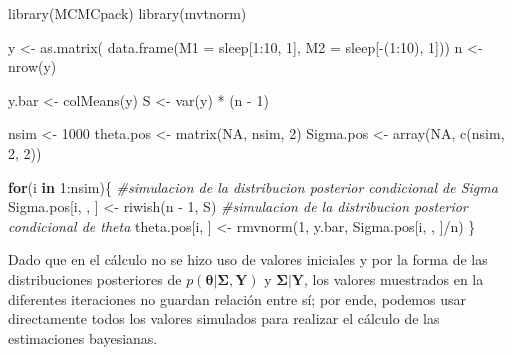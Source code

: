 \documentclass[
  10pt,
  spanish,
]{book}
\newenvironment{Shaded}{\begin{snugshade}}{\end{snugshade}}
\newcommand{\AttributeTok}[1]{\textcolor[rgb]{0.77,0.63,0.00}{#1}}
\newcommand{\CommentTok}[1]{\textcolor[rgb]{0.56,0.35,0.01}{\textit{#1}}}
\newcommand{\ConstantTok}[1]{\textcolor[rgb]{0.00,0.00,0.00}{#1}}
\newcommand{\ControlFlowTok}[1]{\textcolor[rgb]{0.13,0.29,0.53}{\textbf{#1}}}
\newcommand{\DecValTok}[1]{\textcolor[rgb]{0.00,0.00,0.81}{#1}}
\newcommand{\FunctionTok}[1]{\textcolor[rgb]{0.00,0.00,0.00}{#1}}
\newcommand{\NormalTok}[1]{#1}
\newcommand{\OtherTok}[1]{\textcolor[rgb]{0.56,0.35,0.01}{#1}}
\newcommand{\SpecialCharTok}[1]{\textcolor[rgb]{0.00,0.00,0.00}{#1}}
\theoremstyle{definition}
\theoremstyle{definition}
\theoremstyle{definition}
\theoremstyle{definition}
\theoremstyle{remark}
\begin{document}
\begin{Shaded}
\begin{Highlighting}[]
\FunctionTok{library}\NormalTok{(MCMCpack)}
\FunctionTok{library}\NormalTok{(mvtnorm)}

\NormalTok{y }\OtherTok{\textless{}{-}} \FunctionTok{as.matrix}\NormalTok{(}
  \FunctionTok{data.frame}\NormalTok{(}\AttributeTok{M1 =}\NormalTok{ sleep[}\DecValTok{1}\SpecialCharTok{:}\DecValTok{10}\NormalTok{, }\DecValTok{1}\NormalTok{], }
             \AttributeTok{M2 =}\NormalTok{ sleep[}\SpecialCharTok{{-}}\NormalTok{(}\DecValTok{1}\SpecialCharTok{:}\DecValTok{10}\NormalTok{), }\DecValTok{1}\NormalTok{]))}
\NormalTok{n }\OtherTok{\textless{}{-}} \FunctionTok{nrow}\NormalTok{(y)}

\NormalTok{y.bar }\OtherTok{\textless{}{-}} \FunctionTok{colMeans}\NormalTok{(y)}
\NormalTok{S }\OtherTok{\textless{}{-}} \FunctionTok{var}\NormalTok{(y) }\SpecialCharTok{*}\NormalTok{ (n }\SpecialCharTok{{-}} \DecValTok{1}\NormalTok{)}

\NormalTok{nsim }\OtherTok{\textless{}{-}} \DecValTok{1000}
\NormalTok{theta.pos }\OtherTok{\textless{}{-}} \FunctionTok{matrix}\NormalTok{(}\ConstantTok{NA}\NormalTok{, nsim, }\DecValTok{2}\NormalTok{)}
\NormalTok{Sigma.pos }\OtherTok{\textless{}{-}} \FunctionTok{array}\NormalTok{(}\ConstantTok{NA}\NormalTok{, }\FunctionTok{c}\NormalTok{(nsim, }\DecValTok{2}\NormalTok{, }\DecValTok{2}\NormalTok{))}

\ControlFlowTok{for}\NormalTok{(i }\ControlFlowTok{in} \DecValTok{1}\SpecialCharTok{:}\NormalTok{nsim)\{}
  \CommentTok{\#simulacion de la distribucion posterior condicional de Sigma}
\NormalTok{  Sigma.pos[i, , ] }\OtherTok{\textless{}{-}} \FunctionTok{riwish}\NormalTok{(n }\SpecialCharTok{{-}} \DecValTok{1}\NormalTok{, S)}
  \CommentTok{\#simulacion de la distribucion posterior condicional de theta}
\NormalTok{  theta.pos[i, ] }\OtherTok{\textless{}{-}} \FunctionTok{rmvnorm}\NormalTok{(}\DecValTok{1}\NormalTok{, y.bar, Sigma.pos[i, , ]}\SpecialCharTok{/}\NormalTok{n)}
\NormalTok{\}}
\end{Highlighting}
\end{Shaded}

Dado que en el cálculo no se hizo uso de valores iniciales y por la forma de las distribuciones posteriores de \(p(\boldsymbol \theta|\boldsymbol \Sigma,\mathbf{Y})\) y \(\boldsymbol \Sigma|\mathbf{Y}\), los valores muestrados en la diferentes iteraciones no guardan relación entre sí; por ende, podemos usar directamente todos los valores simulados para realizar el cálculo de las estimaciones bayesianas.
\end{document}

